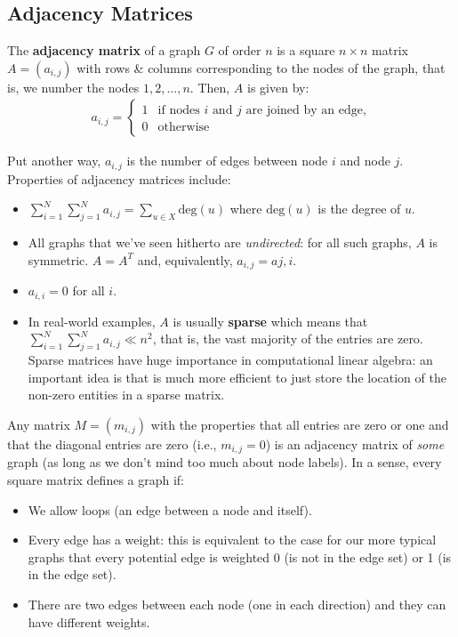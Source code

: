 \documentclass[a4paper,11pt]{article}
\begin{document}
\subsection{Adjacency Matrices}
The \textbf{adjacency matrix} of a graph $G$ of order $n$ is a square $n \times n$ matrix $A = (a_{i,j})$ with rows \& columns corresponding to the nodes of the graph, that is, we number the nodes $1, 2, \dots, n$.
Then, $A$ is given by:
\begin{align*}
    a_{i,j} =
    \begin{cases}
        1 & \text{if nodes } i \text{ and } j \text{ are joined by an edge,} \\
        0 & \text{otherwise}
    \end{cases}
\end{align*}

Put another way, $a_{i,j}$ is the number of edges between node $i$ and node $j$.
Properties of adjacency matrices include:
\begin{itemize}
    \item   $\sum^N_{i=1} \sum^N_{j=1} a_{i,j} = \sum_{u \in X}\text{deg}(u)$ where $\text{deg}(u)$ is the degree of $u$.
    \item   All graphs that we've seen hitherto are \textit{undirected}: for all such graphs, $A$ is symmetric.
            $A = A^T$ and, equivalently, $a_{i,j} = a{j,i}$.
    \item   $a_{i,i} = 0$ for all $i$.
    \item   In real-world examples, $A$ is usually \textbf{sparse} which means that $\sum^N_{i=1} \sum^N_{j=1} a_{i,j} \ll n^2$, that is, the vast majority of the entries are zero.
            Sparse matrices have huge importance in computational linear algebra: an important idea is that is much more efficient to just store the location of the non-zero entities in a sparse matrix.
\end{itemize}

Any matrix $M = (m_{i,j})$ with the properties that all entries are zero or one and that the diagonal entries are zero (i.e., $m_{i,j}=0$) is an adjacency matrix of \textit{some} graph (as long as we don't mind too much about node labels).
In a sense, every square matrix defines a graph if:
\begin{itemize}
    \item   We allow loops (an edge between a node and itself).
    \item   Every edge has a weight: this is equivalent to the case for our more typical graphs that every potential edge is weighted 0 (is not in the edge set)  or 1 (is in the edge set).
    \item    There are two edges between each node (one in each direction) and they can have different weights.
\end{itemize}
\end{document}
